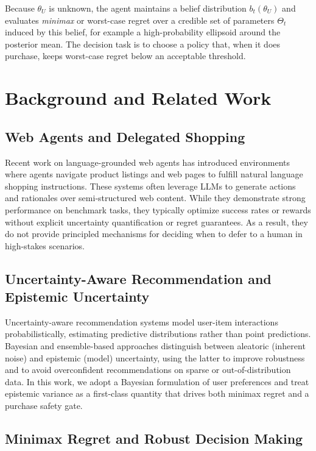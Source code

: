 \documentclass[11pt]{article}
\begin{document}
Because $\theta_U$ is unknown, the agent maintains a belief distribution $b_t(\theta_U)$ and evaluates \emph{minimax} or worst-case regret over a credible set of parameters $\Theta_t$ induced by this belief, for example a high-probability ellipsoid around the posterior mean.\cite{rigter2020minimax} The decision task is to choose a policy that, when it does purchase, keeps worst-case regret below an acceptable threshold.\cite{regretDecision1982}

\section{Background and Related Work}

\subsection{Web Agents and Delegated Shopping}

Recent work on language-grounded web agents has introduced environments where agents navigate product listings and web pages to fulfill natural language shopping instructions.\cite{yao2022webshop} These systems often leverage LLMs to generate actions and rationales over semi-structured web content.\cite{yao2022webshop} While they demonstrate strong performance on benchmark tasks, they typically optimize success rates or rewards without explicit uncertainty quantification or regret guarantees. As a result, they do not provide principled mechanisms for deciding when to defer to a human in high-stakes scenarios.

\subsection{Uncertainty-Aware Recommendation and Epistemic Uncertainty}

Uncertainty-aware recommendation systems model user-item interactions probabilistically, estimating predictive distributions rather than point predictions. Bayesian and ensemble-based approaches distinguish between aleatoric (inherent noise) and epistemic (model) uncertainty, using the latter to improve robustness and to avoid overconfident recommendations on sparse or out-of-distribution data.\cite{bdecf2025} In this work, we adopt a Bayesian formulation of user preferences and treat epistemic variance as a first-class quantity that drives both minimax regret and a purchase safety gate.\cite{charpentier2022disentangling}

\subsection{Minimax Regret and Robust Decision Making}
\end{document}
